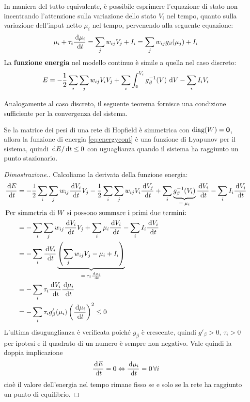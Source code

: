 In maniera del tutto equivalente, è possibile esprimere l'equazione di stato non incentrando l'attenzione sulla variazione dello stato $V_i$ nel tempo, quanto sulla variazione dell'input netto $\mu_i$ nel tempo, pervenendo alla seguente equazione:
\begin{displaymath}
	\mu_i + \tau_i \frac{\, \mathrm{d}\mu_i}{\, \mathrm{d} t} = \sum_j w_{ij} V_j + I_i = \sum_j w_{ij} g_\beta (\mu_j) + I_i \\
\end{displaymath}
La \textbf{funzione energia} nel modello continuo è simile a quella nel caso discreto:
\begin{align}
	E = - \frac{1}{2} \sum_i \sum_j w_{ij} V_i V_j + \sum_i \int_0^{V_i} g^{-1}_\beta (V) \, \, \mathrm{d} V - \sum_i I_i V_i \label{eq:energycont}
\end{align}

\noindent Analogamente al caso discreto, il seguente teorema fornisce una condizione sufficiente per la convergenza del sistema.
\begin{thm}
	Se la matrice dei pesi di una rete di Hopfield è simmetrica con $\diag(W) = \vec{0}$, allora la funzione di energia \eqref{eq:energycont} è una funzione di Lyapunov per il sistema, quindi $\, \mathrm{d} E / \, \mathrm{d} t \leq 0$ con uguaglianza quando il sistema ha raggiunto un punto stazionario.
\end{thm}

\begin{proof}[Dimostrazione.]
	Calcoliamo la derivata della funzione energia:
	\begin{align*}
		\frac{\, \mathrm{d} E}{\, \mathrm{d} t} &= - \frac{1}{2} \sum_i \sum_j w_{ij} \frac{\, \mathrm{d} V_i}{\, \mathrm{d} t} V_j - \frac{1}{2} \sum_i \sum_j w_{ij} V_i \frac{\, \mathrm{d} V_j}{\, \mathrm{d} t} + \sum_i \underbrace{g_\beta^{-1}(V_i)}_\textrm{$= \mu_i$} \frac{\, \mathrm{d} V_i}{\, \mathrm{d} t} - \sum_i I_i \frac{\, \mathrm{d} V_i}{\, \mathrm{d} t} \\
		\intertext{Per simmetria di $W$ si possono sommare i primi due termini:}
		&=  - \sum_i \sum_j w_{ij} \frac{\, \mathrm{d} V_i}{\, \mathrm{d} t} V_j + \sum_i \mu_i \frac{\, \mathrm{d} V_i}{\, \mathrm{d} t} - \sum_i I_i \frac{\, \mathrm{d} V_i}{\, \mathrm{d} t} \\
		&= - \sum_i \frac{\, \mathrm{d} V_i}{\, \mathrm{d} t} \underbrace{\left(\sum_j w_{ij} V_j - \mu_i + I_i \right)}_\textrm{$ = \tau_i \frac{\, \mathrm{d} \mu_i}{\, \mathrm{d} t}$} \\
		&= - \sum_i \tau_i \frac{\, \mathrm{d} V_i}{\, \mathrm{d} t} \frac{\, \mathrm{d} \mu_i}{\, \mathrm{d} t} \\
		&= - \sum_i \tau_i g'_\beta(\mu_i) \left(\frac{\, \mathrm{d} \mu_i}{\, \mathrm{d} t} \right)^2 \leq 0
	\end{align*}
	L'ultima disuguaglianza è verificata poiché $g_\beta$ è crescente, quindi $g'_\beta > 0$, $\tau_i > 0$ per ipotesi e il quadrato di un numero è sempre non negativo. Vale quindi la doppia implicazione
	\begin{align*}
		\frac{\, \mathrm{d} E}{\, \mathrm{d} t} = 0 \Leftrightarrow \frac{\, \mathrm{d} \mu_i}{\, \mathrm{d} t} = 0 \,\forall i
	\end{align*}
	cioè il valore dell'energia nel tempo rimane fisso se e solo se la rete ha raggiunto un punto di equilibrio.
\end{proof}

